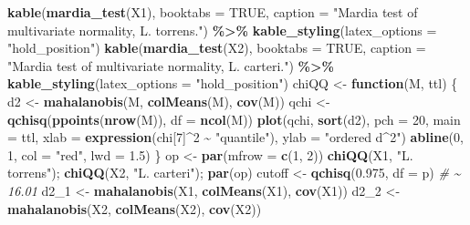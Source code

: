 \documentclass[
  11pt,
]{article}
\newenvironment{Shaded}{\begin{snugshade}}{\end{snugshade}}
\newcommand{\AttributeTok}[1]{\textcolor[rgb]{0.13,0.29,0.53}{#1}}
\newcommand{\CommentTok}[1]{\textcolor[rgb]{0.56,0.35,0.01}{\textit{#1}}}
\newcommand{\ConstantTok}[1]{\textcolor[rgb]{0.56,0.35,0.01}{#1}}
\newcommand{\ControlFlowTok}[1]{\textcolor[rgb]{0.13,0.29,0.53}{\textbf{#1}}}
\newcommand{\DecValTok}[1]{\textcolor[rgb]{0.00,0.00,0.81}{#1}}
\newcommand{\FloatTok}[1]{\textcolor[rgb]{0.00,0.00,0.81}{#1}}
\newcommand{\FunctionTok}[1]{\textcolor[rgb]{0.13,0.29,0.53}{\textbf{#1}}}
\newcommand{\NormalTok}[1]{#1}
\newcommand{\OtherTok}[1]{\textcolor[rgb]{0.56,0.35,0.01}{#1}}
\newcommand{\SpecialCharTok}[1]{\textcolor[rgb]{0.81,0.36,0.00}{\textbf{#1}}}
\newcommand{\StringTok}[1]{\textcolor[rgb]{0.31,0.60,0.02}{#1}}
\begin{document}
\begin{Shaded}
\begin{Highlighting}[]
\FunctionTok{kable}\NormalTok{(}\FunctionTok{mardia\_test}\NormalTok{(X1), }\AttributeTok{booktabs =} \ConstantTok{TRUE}\NormalTok{,}
      \AttributeTok{caption =} \StringTok{"Mardia test of multivariate normality, L. torrens."}\NormalTok{) }\SpecialCharTok{\%\textgreater{}\%}
  \FunctionTok{kable\_styling}\NormalTok{(}\AttributeTok{latex\_options =} \StringTok{"hold\_position"}\NormalTok{)}
\FunctionTok{kable}\NormalTok{(}\FunctionTok{mardia\_test}\NormalTok{(X2), }\AttributeTok{booktabs =} \ConstantTok{TRUE}\NormalTok{,}
      \AttributeTok{caption =} \StringTok{"Mardia test of multivariate normality, L. carteri."}\NormalTok{) }\SpecialCharTok{\%\textgreater{}\%}
  \FunctionTok{kable\_styling}\NormalTok{(}\AttributeTok{latex\_options =} \StringTok{"hold\_position"}\NormalTok{)}
\NormalTok{chiQQ }\OtherTok{\textless{}{-}} \ControlFlowTok{function}\NormalTok{(M, ttl) \{}
\NormalTok{  d2   }\OtherTok{\textless{}{-}} \FunctionTok{mahalanobis}\NormalTok{(M, }\FunctionTok{colMeans}\NormalTok{(M), }\FunctionTok{cov}\NormalTok{(M))}
\NormalTok{  qchi }\OtherTok{\textless{}{-}} \FunctionTok{qchisq}\NormalTok{(}\FunctionTok{ppoints}\NormalTok{(}\FunctionTok{nrow}\NormalTok{(M)), }\AttributeTok{df =} \FunctionTok{ncol}\NormalTok{(M))}
  \FunctionTok{plot}\NormalTok{(qchi, }\FunctionTok{sort}\NormalTok{(d2), }\AttributeTok{pch =} \DecValTok{20}\NormalTok{, }\AttributeTok{main =}\NormalTok{ ttl,}
       \AttributeTok{xlab =} \FunctionTok{expression}\NormalTok{(chi[}\DecValTok{7}\NormalTok{]}\SpecialCharTok{\^{}}\DecValTok{2} \SpecialCharTok{\textasciitilde{}} \StringTok{"quantile"}\NormalTok{),}
       \AttributeTok{ylab =} \StringTok{"ordered  d\^{}2"}\NormalTok{)}
  \FunctionTok{abline}\NormalTok{(}\DecValTok{0}\NormalTok{, }\DecValTok{1}\NormalTok{, }\AttributeTok{col =} \StringTok{"red"}\NormalTok{, }\AttributeTok{lwd =} \FloatTok{1.5}\NormalTok{)}
\NormalTok{\}}
\NormalTok{op }\OtherTok{\textless{}{-}} \FunctionTok{par}\NormalTok{(}\AttributeTok{mfrow =} \FunctionTok{c}\NormalTok{(}\DecValTok{1}\NormalTok{, }\DecValTok{2}\NormalTok{))}
\FunctionTok{chiQQ}\NormalTok{(X1, }\StringTok{"L. torrens"}\NormalTok{); }\FunctionTok{chiQQ}\NormalTok{(X2, }\StringTok{"L. carteri"}\NormalTok{); }\FunctionTok{par}\NormalTok{(op)}
\NormalTok{cutoff }\OtherTok{\textless{}{-}} \FunctionTok{qchisq}\NormalTok{(}\FloatTok{0.975}\NormalTok{, }\AttributeTok{df =}\NormalTok{ p)        }\CommentTok{\# \textasciitilde{} 16.01}
\NormalTok{d2\_1   }\OtherTok{\textless{}{-}} \FunctionTok{mahalanobis}\NormalTok{(X1, }\FunctionTok{colMeans}\NormalTok{(X1), }\FunctionTok{cov}\NormalTok{(X1))}
\NormalTok{d2\_2   }\OtherTok{\textless{}{-}} \FunctionTok{mahalanobis}\NormalTok{(X2, }\FunctionTok{colMeans}\NormalTok{(X2), }\FunctionTok{cov}\NormalTok{(X2))}


\end{Highlighting}
\end{Shaded}
\end{document}
